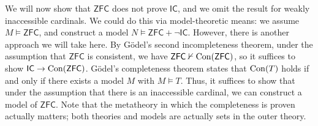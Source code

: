 We will now show that \( \mathsf{ZFC} \) does not prove \( \mathsf{IC} \), and we omit the result for weakly inaccessible cardinals.
We could do this via model-theoretic means: we assume \( M \vDash \mathsf{ZFC} \), and construct a model \( N \vDash \mathsf{ZFC} + \neg \mathsf{IC} \).
However, there is another approach we will take here.
By G\"odel's second incompleteness theorem, under the assumption that \( \mathsf{ZFC} \) is consistent, we have \( \mathsf{ZFC} \nvdash \operatorname{Con}(\mathsf{ZFC}) \), so it suffices to show \( \mathsf{IC} \to \operatorname{Con}(\mathsf{ZFC}) \).
G\"odel's completeness theorem states that \( \operatorname{Con}(T) \) holds if and only if there exists a model \( M \) with \( M \vDash T \).
Thus, it suffices to show that under the assumption that there is an inaccessible cardinal, we can construct a model of \( \mathsf{ZFC} \).
Note that the metatheory in which the completeness is proven actually matters; both theories and models are actually sets in the outer theory.

